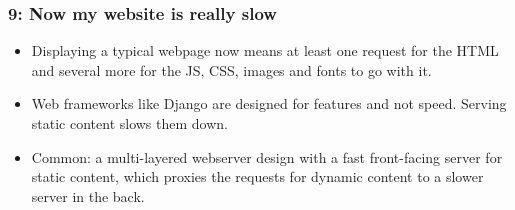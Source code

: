\documentclass{beamer}
\begin{document}
\begin{frame}
\begin{center}
  \end{center}
\end{frame}

\begin{frame}
  \frametitle{9: Now my website is really slow}

  \begin{itemize}
  \item Displaying a typical webpage now means at least one request
    for the HTML and several more for the JS, CSS, images and fonts to
    go with it.
  \item Web frameworks like Django are designed for features and not
    speed. Serving static content slows them down.
  \item Common: a multi-layered webserver design with a fast
    front-facing server for static content, which proxies the requests
    for dynamic content to a slower server in the back.
  \end{itemize}
\end{frame}
\end{document}

